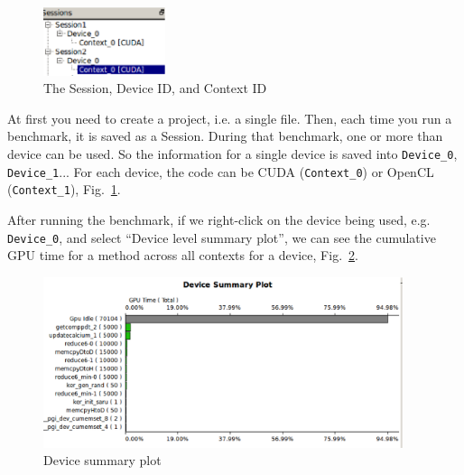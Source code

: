 \begin{figure}[hbt]
  \centerline{\includegraphics[height=2cm,
    angle=0]{./images/profiler_gui_1.eps}}
\caption{The Session, Device ID, and Context ID}
\label{fig:gui_1}
\end{figure}

At first you need to create a project, i.e. a single file. Then, each
time you run a benchmark, it is saved as a Session. During that
benchmark, one or more than device can be used. So the information for
a single device is saved into \verb!Device_0!, \verb!Device_1!... For
each device, the code can be CUDA (\verb!Context_0!) or OpenCL
(\verb!Context_1!), Fig.~\ref{fig:gui_1}.

After running the benchmark, if we right-click on the device being
used, e.g. \verb!Device_0!, and select ``Device level summary plot'',
we can see the cumulative GPU time for a method across all contexts
for a device, Fig.~\ref{fig:device_summary}. 

\begin{figure}[hbt]
  \centerline{\includegraphics[height=5cm,
    angle=0]{./images/device_summary.eps}}
\caption{Device summary plot}
\label{fig:device_summary}
\end{figure}
  
